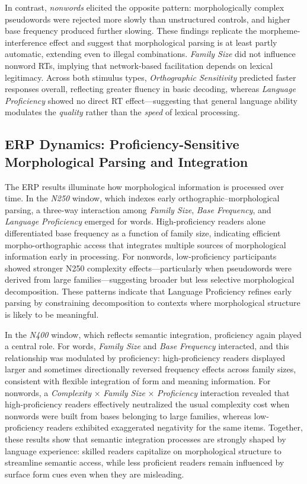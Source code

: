 \documentclass[preprint,12pt, authoryear, review]{elsarticle}
\begin{document}
In contrast, \textit{nonwords} elicited the opposite pattern: morphologically complex pseudowords were rejected more slowly than unstructured controls, and higher base frequency produced further slowing. These findings replicate the morpheme-interference effect and suggest that morphological parsing is at least partly automatic, extending even to illegal combinations. \textit{Family Size} did not influence nonword RTs, implying that network-based facilitation depends on lexical legitimacy. Across both stimulus types, \textit{Orthographic Sensitivity} predicted faster responses overall, reflecting greater fluency in basic decoding, whereas \textit{Language Proficiency} showed no direct RT effect—suggesting that general language ability modulates the \textit{quality} rather than the \textit{speed} of lexical processing.

\subsection{ERP Dynamics: Proficiency-Sensitive Morphological Parsing and Integration}

The ERP results illuminate how morphological information is processed over time. In the \textit{N250} window, which indexes early orthographic–morphological parsing, a three-way interaction among \textit{Family Size}, \textit{Base Frequency}, and \textit{Language Proficiency} emerged for words. High-proficiency readers alone differentiated base frequency as a function of family size, indicating efficient morpho-orthographic access that integrates multiple sources of morphological information early in processing. For nonwords, low-proficiency participants showed stronger N250 complexity effects—particularly when pseudowords were derived from large families—suggesting broader but less selective morphological decomposition. These patterns indicate that Language Proficiency refines early parsing by constraining decomposition to contexts where morphological structure is likely to be meaningful.

In the \textit{N400} window, which reflects semantic integration, proficiency again played a central role. For words, \textit{Family Size} and \textit{Base Frequency} interacted, and this relationship was modulated by proficiency: high-proficiency readers displayed larger and sometimes directionally reversed frequency effects across family sizes, consistent with flexible integration of form and meaning information. For nonwords, a \textit{Complexity} × \textit{Family Size} × \textit{Proficiency} interaction revealed that high-proficiency readers effectively neutralized the usual complexity cost when nonwords were built from bases belonging to large families, whereas low-proficiency readers exhibited exaggerated negativity for the same items. Together, these results show that semantic integration processes are strongly shaped by language experience: skilled readers capitalize on morphological structure to streamline semantic access, while less proficient readers remain influenced by surface form cues even when they are misleading.
\end{document}
